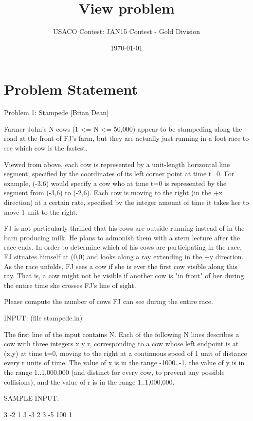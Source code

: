 \documentclass[12pt]{article}
\title{View problem}
\author{USACO Contest: JAN15 Contest - Gold Division}
\date{\today}
\begin{document}
\maketitle

\section*{Problem Statement}

Problem 1: Stampede [Brian Dean]

Farmer John's N cows (1 <= N <= 50,000) appear to be stampeding along
the road at the front of FJ's farm, but they are actually just running
in a foot race to see which cow is the fastest.

Viewed from above, each cow is represented by a unit-length horizontal
line segment, specified by the coordinates of its left corner point at
time t=0.  For example, (-3,6) would specify a cow who at time t=0 is
represented by the segment from (-3,6) to (-2,6).  Each cow is moving to
the right (in the +x direction) at a certain rate, specified by the
integer amount of time it takes her to move 1 unit to the right.

FJ is not particularly thrilled that his cows are outside running
instead of in the barn producing milk.  He plans to admonish them with
a stern lecture after the race ends.  In order to determine which of
his cows are participating in the race, FJ situates himself at (0,0)
and looks along a ray extending in the +y direction.  As the race
unfolds, FJ sees a cow if she is ever the first cow visible along this
ray.  That is, a cow might not be visible if another cow is "in front"
of her during the entire time she crosses FJ's line of sight.

Please compute the number of cows FJ can see during the entire race.

INPUT: (file stampede.in)

The first line of the input contains N.  Each of the following N lines
describes a cow with three integers x y r, corresponding to a cow
whose left endpoint is at (x,y) at time t=0, moving to the right at a
continuous speed of 1 unit of distance every r units of time.  The
value of x is in the range -1000..-1, the value of y is in the range
1..1,000,000 (and distinct for every cow, to prevent any possible
collisions), and the value of r is in the range 1..1,000,000.

SAMPLE INPUT:

3
-2 1 3
-3 2 3
-5 100 1
\end{document}
